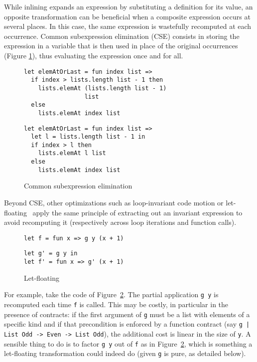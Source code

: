 \documentclass[sigplan,screen,10pt]{acmart}
\newcommand{\nickel}[1]{\lstinline[language=nickel]{#1}}
\begin{document}
While inlining expands an expression by substituting a definition for its value,
an opposite transformation can be beneficial when a composite expression occurs
at several places. In this case, the same expression is wastefully recomputed at
each occurrence. Common subexpression elimination (CSE) consists in storing the
expression in a variable that is then used in place of the original occurrences
(Figure \ref{fig:optimizations-cse-ex}), thus evaluating the expression once and
for all.

\begin{figure}[h]
  \begin{center}
\begin{lstlisting}[language=nickel,title={Source program}]
let elemAtOrLast = fun index list =>
  if index > lists.length list - 1 then
    lists.elemAt (lists.length list - 1)
                 list
  else
    lists.elemAt index list
\end{lstlisting}
\begin{lstlisting}[language=nickel,title={Optimized program}]
let elemAtOrLast = fun index list =>
  let l = lists.length list - 1 in
  if index > l then
    lists.elemAt l list
  else
    lists.elemAt index list
\end{lstlisting}
  \end{center}
\caption{Common subexpression elimination}
\label{fig:optimizations-cse-ex}
\end{figure}

Beyond CSE, other optimizations such as loop-invariant code motion or
let-floating~\cite{letFloating} apply the same principle of extracting out an
invariant expression to avoid recomputing it (respectively across loop
iterations and function calls).

\begin{figure}
  \begin{center}
\begin{lstlisting}[language=nickel,title={Source program}]
let f = fun x => g y (x + 1)
\end{lstlisting}
\begin{lstlisting}[language=nickel,title={Optimized program}]
let g' = g y in
let f' = fun x => g' (x + 1)
\end{lstlisting}
  \end{center}
\caption{Let-floating}
\label{fig:optimizations-let-floating-ex}
\end{figure}

For example, take the code of Figure~\ref{fig:optimizations-let-floating-ex}.
The partial application \lstinline+g y+ is recomputed each time \lstinline+f+ is
called. This may be costly, in particular in the presence of contracts: if the
first argument of \lstinline+g+ must be a list with elements of a specific kind
and if that precondition is enforced by a function contract (say \nickel{g |
List Odd -> Even -> List Odd}), the additional cost is linear in the size of
\lstinline+y+. A sensible thing to do is to factor \lstinline+g y+ out of
\lstinline+f+ as in Figure~\ref{fig:optimizations-let-floating-ex}, which is
something a let-floating transformation could indeed do (given \lstinline+g+ is
pure, as detailed below).
\end{document}
